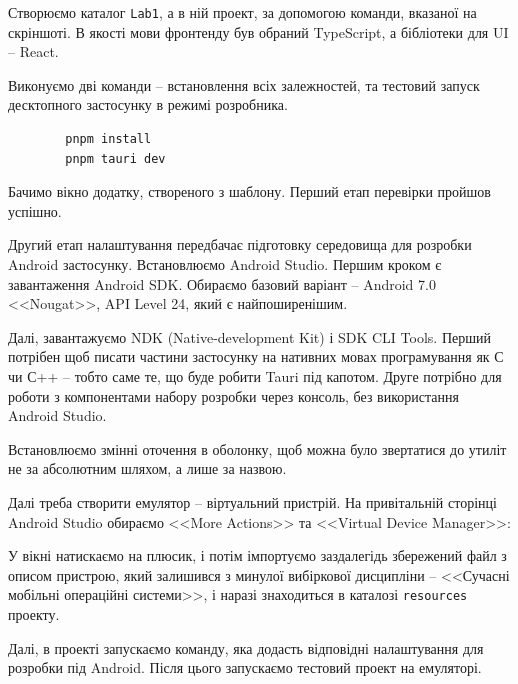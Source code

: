 \documentclass[14pt, a4paper]{extreport}
\begin{document}
	Створюємо каталог \texttt{Lab1}, а в ній проект, за допомогою команди, вказаної на скріншоті. В якості мови фронтенду був обраний TypeScript, а бібліотеки для UI -- React.
	
	
	Виконуємо дві команди -- встановлення всіх залежностей, та тестовий запуск десктопного застосунку в режимі розробника.
	
	\begin{verbatim}
		pnpm install
		pnpm tauri dev
	\end{verbatim}
	
	Бачимо вікно додатку, створеного з шаблону. Перший етап перевірки пройшов успішно.
	
	
	Другий етап налаштування передбачає підготовку середовища для розробки Android застосунку. Встановлюємо Android Studio. Першим кроком є завантаження Android SDK.  Обираємо базовий варіант -- Android 7.0 <<Nougat>>, API Level 24, який є найпоширенішим.
	
	
	Далі, завантажуємо NDK (Native-development Kit) і SDK CLI Tools. Перший потрібен щоб писати частини застосунку на нативних мовах програмування як С чи С++ -- тобто саме те, що буде робити Tauri під капотом. Друге потрібно для роботи з компонентами набору розробки через консоль, без використання Android Studio.
	
	
	Встановлюємо змінні оточення в оболонку, щоб можна було звертатися до утиліт не за абсолютним шляхом, а лише за назвою.
	
	
	Далі треба створити емулятор -- віртуальний пристрій. На привітальній сторінці Android Studio обираємо <<More Actions>> та <<Virtual Device Manager>>:
	
	
	У вікні натискаємо на плюсик, і потім імпортуємо заздалегідь збережений файл з описом пристрою, який залишився з минулої вибіркової дисципліни -- <<Сучасні мобільні операційні системи>>, і наразі знаходиться в каталозі \texttt{resources} проекту.
	
	
	Далі, в проекті запускаємо команду, яка додасть відповідні налаштування для розробки під Android. Після цього запускаємо тестовий проект на емуляторі.
	
\end{document}
